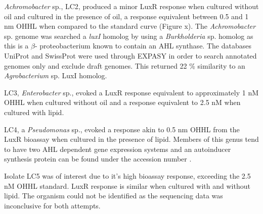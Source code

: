 \documentclass[11pt]{article}
\begin{document}
\emph{Achromobacter} sp., LC2, produced a minor LuxR response when cultured without oil and cultured in the presence of oil, a response equivalent between 0.5 and 1 nm OHHL when compared to the standard curve (Figure x). The \emph{Achromobacter} sp. genome was searched a \emph{luxI} homolog by using a \emph{Burkholderia} sp. homolog as  this is a \emph{$\beta$}- proteobacterium known to contain an AHL synthase. The databases UniProt and SwissProt were used through EXPASY in order to search annotated genomes only and exclude draft genomes. This returned  22 \% similarity to an \emph{Agrobacterium} sp. LuxI homolog.

LC3, \emph{Enterobacter} sp., evoked a LuxR response equivalent to approximately 1 nM OHHL when cultured without oil and a response equivalent to 2.5 nM when cultured with lipid. 

LC4, a \emph{Pseudomonas} sp., evoked a response akin to 0.5 nm OHHL from the LuxR bioassay when cultured in the presence of lipid. Members of this genus tend to have two AHL dependent gene expression systems and an autoinducer synthesis protein can be found under the accession number   .

Isolate LC5 was of interest due to it's high bioassay response, exceeding the 2.5 nM OHHL standard. LuxR response is similar when cultured with and without lipid. The organism could not be identified as the sequencing data was inconclusive for both attempts.



\end{document}
